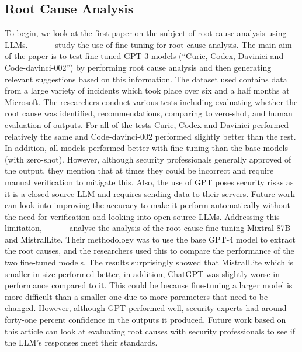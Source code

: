 \subsection{Root Cause Analysis}
To begin, we look at the first paper on the subject of root cause analysis using LLMs.____ study the use of fine-tuning for root-cause analysis. The main aim of the paper is to test fine-tuned GPT-3 models (``Curie, Codex, Davinici and Code-davinci-002'') by performing root cause analysis and then generating relevant suggestions based on this information. The dataset used contains data from a large variety of incidents which took place over six and a half months at Microsoft. The researchers conduct various tests including evaluating whether the root cause was identified, recommendations, comparing to zero-shot, and human evaluation of outputs. For all of the tests Curie, Codex and Davinici performed relatively the same and Code-davinci-002 performed slightly better than the rest. In addition, all models performed better with fine-tuning than the base models (with zero-shot). However, although security professionals generally approved of the output, they mention that at times they could be incorrect and require manual verification to mitigate this. Also, the use of GPT poses security risks as it is a closed-source LLM and requires sending data to their servers. Future work can look into improving the accuracy to make it perform automatically without the need for verification and looking into open-source LLMs. Addressing this limitation,____ analyse the analysis of the root cause fine-tuning Mixtral-87B and MistralLite. Their methodology was to use the base GPT-4 model to extract the root causes, and the researchers used this to compare the performance of the two fine-tuned models. The results surprisingly showed that MistralLite which is smaller in size performed better, in addition, ChatGPT was slightly worse in performance compared to it. This could be because fine-tuning a larger model is more difficult than a smaller one due to more parameters that need to be changed. However, although GPT performed well, security experts had around forty-one percent confidence in the outputs it produced. Future work based on this article can look at evaluating root causes with security professionals to see if the LLM's responses meet their standards.

